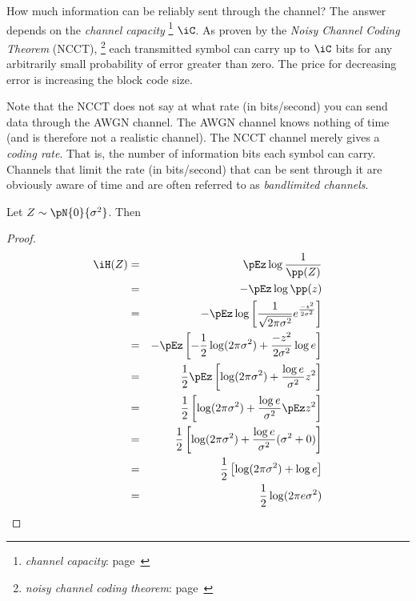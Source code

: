 How much information can be reliably sent through the channel?
The answer depends on the {\em channel capacity} 
\footnote{{\em channel capacity}: 
   page~\pageref{def:iC}
  }
$\iC$.
As proven by the {\em Noisy Channel Coding Theorem} (NCCT),
\footnote{{\em noisy channel coding theorem}:
   page~\pageref{thm:ncct}
  }
each transmitted symbol can carry up to $\iC$ bits for any arbitrarily 
small probability of error greater than zero.
The price for decreasing error is increasing the block code size.

Note that the NCCT does not say at what rate
(in bits/second) you can send data through the AWGN channel.
The AWGN channel knows nothing of time (and is therefore not a 
realistic channel). 
The NCCT channel merely gives a {\em coding rate}.
That is, the number of information bits each symbol can carry.
Channels that limit the rate (in bits/second) that can be sent through
it are obviously aware of time and are often referred to as 
{\em bandlimited channels}.

\begin{theorem}
Let $Z\sim\pN{0}{\sigma^2}$. Then
\end{theorem}
\begin{proof}
\begin{eqnarray*}
  \iH(Z)
    &=& \pEz \log \frac{1}{\pp(Z)}
  \\&=& -\pEz \log \pp(z) 
  \\&=& -\pEz
         \log \left[\frac{1}{\sqrt{2\pi\sigma^2}}e^{\frac{-z^2}{2\sigma^2}} \right] 
  \\&=& -\pEz \left[
        -\frac{1}{2}\log(2\pi\sigma^2) 
        + \frac{-z^2}{2\sigma^2} \log e 
        \right] 
  \\&=& \frac{1}{2} \pEz \left[
        \log(2\pi\sigma^2) 
        + \frac{\log e}{\sigma^2}z^2  
        \right] 
  \\&=& \frac{1}{2} \left[
        \log(2\pi\sigma^2) + \frac{\log e}{\sigma^2}\pEz z^2  
        \right] 
  \\&=& \frac{1}{2} \left[
        \log(2\pi\sigma^2) + \frac{\log e}{\sigma^2}(\sigma^2+0)
        \right] 
  \\&=& \frac{1}{2} \left[
        \log(2\pi\sigma^2) + \log e
        \right] 
  \\&=& \frac{1}{2} \log(2\pi e\sigma^2) 
\end{eqnarray*}
\end{proof}

